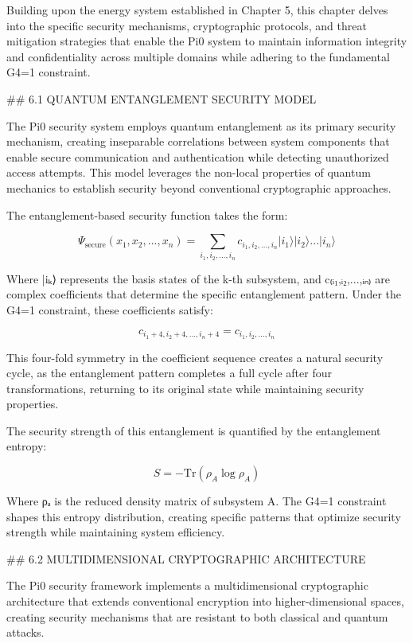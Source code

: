 Building upon the energy system established in Chapter 5, this chapter delves into the specific security mechanisms, cryptographic protocols, and threat mitigation strategies that enable the Pi0 system to maintain information integrity and confidentiality across multiple domains while adhering to the fundamental G4=1 constraint.

## 6.1 QUANTUM ENTANGLEMENT SECURITY MODEL

The Pi0 security system employs quantum entanglement as its primary security mechanism, creating inseparable correlations between system components that enable secure communication and authentication while detecting unauthorized access attempts. This model leverages the non-local properties of quantum mechanics to establish security beyond conventional cryptographic approaches.

The entanglement-based security function takes the form:

$$\Psi_{\text{secure}}(x_1, x_2, ..., x_n) = \sum_{i_1, i_2, ..., i_n} c_{i_1, i_2, ..., i_n} |i_1\rangle |i_2\rangle ... |i_n\rangle$$

Where |iₖ⟩ represents the basis states of the k-th subsystem, and c₍ᵢ₁,ᵢ₂,...,ᵢₙ₎ are complex coefficients that determine the specific entanglement pattern. Under the G4=1 constraint, these coefficients satisfy:

$$c_{i_1+4, i_2+4, ..., i_n+4} = c_{i_1, i_2, ..., i_n}$$

This four-fold symmetry in the coefficient sequence creates a natural security cycle, as the entanglement pattern completes a full cycle after four transformations, returning to its original state while maintaining security properties.

The security strength of this entanglement is quantified by the entanglement entropy:

$$S = -\text{Tr}(\rho_A \log \rho_A)$$

Where ρₐ is the reduced density matrix of subsystem A. The G4=1 constraint shapes this entropy distribution, creating specific patterns that optimize security strength while maintaining system efficiency.

## 6.2 MULTIDIMENSIONAL CRYPTOGRAPHIC ARCHITECTURE

The Pi0 security framework implements a multidimensional cryptographic architecture that extends conventional encryption into higher-dimensional spaces, creating security mechanisms that are resistant to both classical and quantum attacks.

